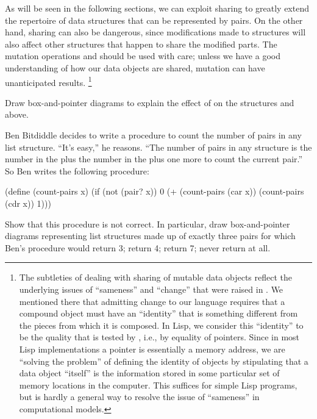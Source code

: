 As will be seen in the following sections, we can exploit sharing to greatly extend the repertoire of data structures that can be represented by pairs.
On the other hand, sharing can also be dangerous, since modifications made to structures will also affect other structures that happen to share the modified parts.
The mutation operations  and  should be used with care;
unless we have a good understanding of how our data objects are shared, mutation can have unanticipated results.%
\footnote{
	The subtleties of dealing with sharing of mutable data objects reflect the underlying issues of “sameness”  and  “change” that were raised in .
	We mentioned there that admitting change to our language requires that a compound object must have an “identity” that is something different from the pieces from which it is composed.
	In Lisp, we consider this “identity” to be the quality that is tested by , i.e., by equality of pointers.
	Since in most Lisp implementations a pointer is essentially a memory address, we are “solving the problem” of defining the identity of objects by stipulating that a data object “itself” is the information stored in some particular set of memory locations in the computer.
	This suffices for simple Lisp programs, but is hardly a general way to resolve the issue of “sameness” in computational models.
}



\begin{exercise}
	\label{Exercise 3.15}
	Draw box-and-pointer diagrams to explain the effect of  on the structures  and  above.
\end{exercise}



\begin{exercise}
	\label{Exercise 3.16}
	Ben Bitdiddle decides to write a procedure to count the number of pairs in any list structure.
	“It’s easy,” he reasons.
	“The number of pairs in any structure is the number in the  plus the number in the  plus one more to count the current pair.”
	So Ben writes the following procedure:
	\begin{scheme}
	  (define (count-pairs x)
	    (if (not (pair? x))
	        0
	        (+ (count-pairs (car x))
	           (count-pairs (cdr x))
	           1)))
	\end{scheme}
	Show that this procedure is not correct.
	In particular, draw box-and-pointer diagrams representing list structures made up of exactly three pairs for which Ben’s procedure would return 3;
	return 4;
	return 7;
	never return at all.
\end{exercise}



